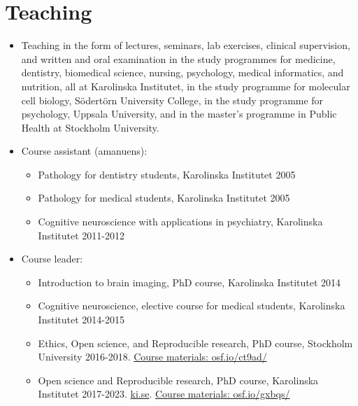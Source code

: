 \documentclass[10pt,a4paper,twocolumn]{article}
\begin{document}
\section{Teaching}
\begin{itemize}

    \item Teaching in the form of lectures, seminars, lab exercises, clinical supervision, and written and oral examination in the study programmes for medicine, dentistry, biomedical science, nursing, psychology, medical informatics, and nutrition, all at Karolinska Institutet, in the study programme for molecular cell biology, Södertörn University College, in the study programme for psychology, Uppsala University, and in the master's programme in Public Health at Stockholm University.


    \item Course assistant (amanuens):

    \begin{itemize}

        \item Pathology for dentistry students, Karolinska Institutet 2005

        \item Pathology for medical students, Karolinska Institutet 2005

        \item Cognitive neuroscience with applications in psychiatry, Karolinska Institutet 2011-2012

    \end{itemize}


    \item Course leader:

    \begin{itemize}

        \item Introduction to brain imaging, PhD course, Karolinska Institutet 2014

        \item Cognitive neuroscience, elective course for medical students, Karolinska Institutet 2014-2015

        \item Ethics, Open science, and Reproducible research, PhD course, Stockholm University 2016-2018. \href{https://osf.io/ct9ad/}{Course materials: osf.io/ct9ad/}

        \item Open science and Reproducible research, PhD course, Karolinska Institutet 2017-2023. \href{https://ki.se}{ki.se}. \href{https://osf.io/gxbqs/}{Course materials: osf.io/gxbqs/}


\end{itemize}
\end{itemize}
\end{document}
